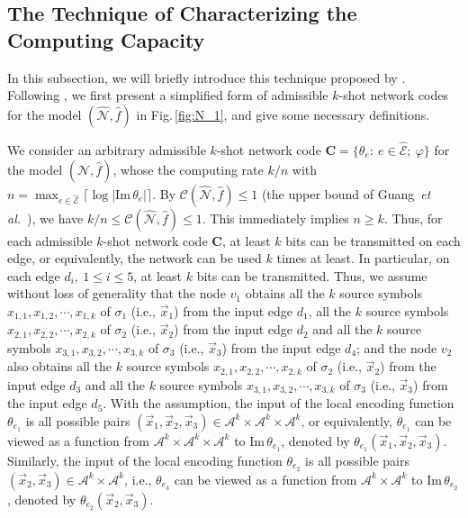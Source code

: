 \documentclass[11pt,draftclsnofoot,onecolumn]{IEEEtran}
\newcommand{\mE}{\mathcal{E}}
\newcommand{\mbC}{\mathbf{C}}
\def\Im{\mathrm{Im}}
\begin{document}
\begin{journalonly}
{\subsection{The Technique of Characterizing the Computing Capacity}\label{subsec:Wang_tech-intro}



In this subsection, we  will briefly introduce  this technique proposed by \cite{Wang-Tightness_upper_bound}. Following \cite{Wang-Tightness_upper_bound},
we first present a simplified  form of  admissible $k$-shot network codes for the model $(\widehat{\mathcal{N}},\widehat{f})$ in Fig.\,\ref{fig:N_1}, and give some necessary definitions.

 We consider an arbitrary admissible $k$-shot network code $\mbC=\big\{\theta_{e}:~e\in \widehat{\mE};~\varphi \big\}$ for the model $(\widehat{\mathcal{N}},\widehat{f})$, whose the computing  rate $k/n$ with $n=\max_{e\in\widehat{\mathcal{E}}}\big\lceil\log|\Im\,\theta_{e}|\big\rceil$. By  $\mathcal{C}(\widehat{\mathcal{N}},\widehat{f})\leq 1$ (the upper bound of Guang~\emph{et al.}~\cite{Guang_Improved_upper_bound}),  we have $k/n\leq\mathcal{C}(\widehat{\mathcal{N}},\widehat{f})\leq 1$.  This immediately implies  $n\geq k$. Thus, for each admissible $k$-shot network
code $\mbC$, at least $k$ bits can be transmitted on each edge, or equivalently, the network can be used $k$ times at least.
In particular, on each edge $d_{i},~1\leq i\leq 5$, at least $k$ bits can be transmitted.
 Thus, we assume without loss of generality that the node $v_1$ obtains all the $k$ source symbols $x_{1,1},x_{1,2},\cdots,x_{1,k}$ of $\sigma_1$ (i.e., $\vec{x}_1$) from the input edge $d_1$, all the $k$ source symbols $x_{2,1},x_{2,2},\cdots,x_{2,k}$  of $\sigma_2$ (i.e., $\vec{x}_2$) from the  input edge $d_2$ and all the $k$ source symbols $x_{3,1},x_{3,2},\cdots,x_{3,k}$  of $\sigma_3$ (i.e., $\vec{x}_3$) from the  input edge $d_4$; and the node $v_2$ also obtains all the $k$ source symbols $x_{2,1},x_{2,2},\cdots,x_{2,k}$   of $\sigma_2$ (i.e., $\vec{x}_2$)  from the input edge $d_3$ and all the $k$ source symbols $x_{3,1},x_{3,2},\cdots,x_{3,k}$  of $\sigma_3$ (i.e., $\vec{x}_3$) from the  input edge $d_5$.
 With the assumption, the input of the local encoding function $\theta_{e_1}$ is all possible pairs $(\vec{x}_1,\vec{x}_2,\vec{x}_3)\in\mathcal{A}^k\times\mathcal{A}^k\times\mathcal{A}^k$, or equivalently, $\theta_{e_1}$ can be viewed as a function from $\mathcal{A}^k\times\mathcal{A}^k\times\mathcal{A}^k$ to $\Im\,\theta_{e_1}$, denoted by $\theta_{e_1}(\vec{x}_1,\vec{x}_2,\vec{x}_3)$. Similarly, the input of the local encoding function $\theta_{e_2}$ is all possible pairs $(\vec{x}_2,\vec{x}_3)\in\mathcal{A}^k\times\mathcal{A}^k$, i.e., $\theta_{e_3}$ can be viewed as a function from $\mathcal{A}^k\times\mathcal{A}^k$ to $\Im\,\theta_{e_2}$, denoted by $\theta_{e_2}(\vec{x}_2,\vec{x}_3)$.
}
\end{journalonly}
\end{document}
